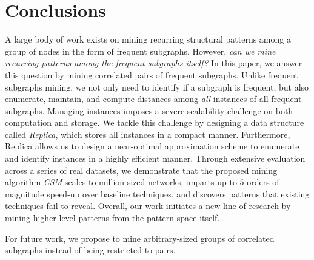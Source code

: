 \vspace{-0.10in}
\section{Conclusions}
\label{sec:conclusions}

A large body of work exists on mining recurring structural patterns among a group of nodes in the form of frequent subgraphs. However, \textit{can we mine recurring patterns among the frequent subgraphs itself?}  In this paper, we answer this question by mining correlated pairs of frequent subgraphs. Unlike frequent subgraphs mining, we not only need to identify if a subgraph is frequent, but also enumerate, maintain, and compute distances among \emph{all} instances of all frequent subgraphs. Managing instances imposes a severe scalability challenge on both computation and storage. We tackle this challenge by designing a data structure called \emph{Replica}, which stores all instances in a compact manner. Furthermore, Replica allows us to design a near-optimal approximation scheme to enumerate and identify instances in a highly efficient manner. Through extensive evaluation across a series of real datasets, we demonstrate that the proposed mining algorithm \emph{CSM} scales to million-sized networks, imparts up to $5$ orders of magnitude speed-up over baseline techniques, and discovers patterns that existing techniques fail to reveal. Overall, our work initiates a new line of research by mining higher-level patterns from the pattern space itself.

For future work, we propose to mine arbitrary-sized groups of correlated subgraphs instead of being restricted to pairs.

